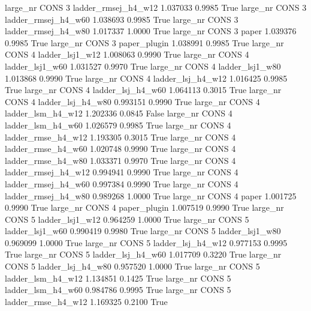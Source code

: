   large_nr     CONS                 3 ladder_rmsej_h4_w12   1.037033      0.9985    True
  large_nr     CONS                 3 ladder_rmsej_h4_w60   1.038693      0.9985    True
  large_nr     CONS                 3 ladder_rmsej_h4_w80   1.017337      1.0000    True
  large_nr     CONS                 3               paper   1.039376      0.9985    True
  large_nr     CONS                 3        paper_plugin   1.038991      0.9985    True
  large_nr     CONS                 4     ladder_lsj1_w12   1.008063      0.9990    True
  large_nr     CONS                 4     ladder_lsj1_w60   1.031527      0.9970    True
  large_nr     CONS                 4     ladder_lsj1_w80   1.013868      0.9990    True
  large_nr     CONS                 4   ladder_lsj_h4_w12   1.016425      0.9985    True
  large_nr     CONS                 4   ladder_lsj_h4_w60   1.064113      0.3015    True
  large_nr     CONS                 4   ladder_lsj_h4_w80   0.993151      0.9990    True
  large_nr     CONS                 4   ladder_lsm_h4_w12   1.202336      0.0845   False
  large_nr     CONS                 4   ladder_lsm_h4_w60   1.026579      0.9985    True
  large_nr     CONS                 4  ladder_rmse_h4_w12   1.193305      0.3015    True
  large_nr     CONS                 4  ladder_rmse_h4_w60   1.020748      0.9990    True
  large_nr     CONS                 4  ladder_rmse_h4_w80   1.033371      0.9970    True
  large_nr     CONS                 4 ladder_rmsej_h4_w12   0.994941      0.9990    True
  large_nr     CONS                 4 ladder_rmsej_h4_w60   0.997384      0.9990    True
  large_nr     CONS                 4 ladder_rmsej_h4_w80   0.989268      1.0000    True
  large_nr     CONS                 4               paper   1.001725      0.9990    True
  large_nr     CONS                 4        paper_plugin   1.007519      0.9990    True
  large_nr     CONS                 5     ladder_lsj1_w12   0.964259      1.0000    True
  large_nr     CONS                 5     ladder_lsj1_w60   0.990419      0.9980    True
  large_nr     CONS                 5     ladder_lsj1_w80   0.969099      1.0000    True
  large_nr     CONS                 5   ladder_lsj_h4_w12   0.977153      0.9995    True
  large_nr     CONS                 5   ladder_lsj_h4_w60   1.017709      0.3220    True
  large_nr     CONS                 5   ladder_lsj_h4_w80   0.957520      1.0000    True
  large_nr     CONS                 5   ladder_lsm_h4_w12   1.134851      0.1425    True
  large_nr     CONS                 5   ladder_lsm_h4_w60   0.984786      0.9995    True
  large_nr     CONS                 5  ladder_rmse_h4_w12   1.169325      0.2100    True
